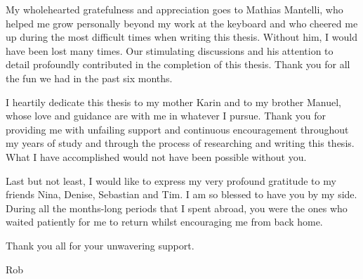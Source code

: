 
My wholehearted gratefulness and appreciation goes to Mathias Mantelli, who helped me grow personally beyond my work at the keyboard and who cheered me up during the most difficult times when writing this thesis. Without him, I would have been lost many times. Our stimulating discussions and his attention to detail profoundly contributed in the completion of this thesis. Thank you for all the fun we had in the past six months.

I heartily dedicate this thesis to my mother Karin and to my brother Manuel, whose love and guidance are with me in whatever I pursue. Thank you for providing me with unfailing support and continuous encouragement throughout my years of study and through the process of researching and writing this thesis. What I have accomplished would not have been possible without you.

Last but not least, I would like to express my very profound gratitude to my friends Nina, Denise, Sebastian and Tim. I am so blessed to have you by my side. During all the months-long periods that I spent abroad, you were the ones who waited patiently for me to return whilst encouraging me from back home.

\bigskip
\noindent
Thank you all for your unwavering support.

\bigskip
\noindent
Rob

\endgroup



